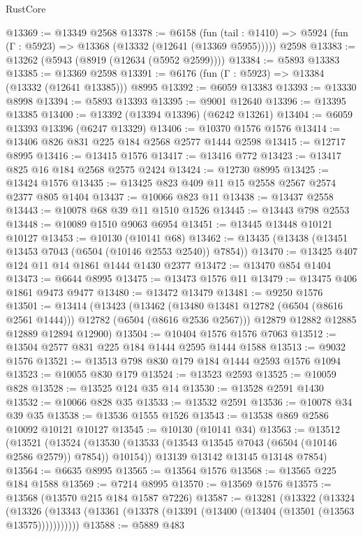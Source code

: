 \begin{lexlean}{RustCore}
\begin{coremodule}
@13369 := @13349 @2568
@13378 := @6158
    (fun (tail : @1410) => @5924 (fun (Γ : @5923) => @13368 (@13332 (@12641 (@13369 @5955)))))
    @2598
@13383 := @13262 (@5943 (@8919 (@12634 (@5952 @2599))))
@13384 := @5893 @13383
@13385 := @13369 @2598
@13391 := @6176 (fun (Γ : @5923) => @13384 (@13332 (@12641 @13385))) @8995
@13392 := @6059 @13383
@13393 := @13330 @8998
@13394 := @5893 @13393
@13395 := @9001 @12640
@13396 := @13395 @13385
@13400 := @13392 (@13394 @13396) (@6242 @13261)
@13404 := @6059 @13393 @13396 (@6247 @13329)
@13406 := @10370 @1576 @1576
@13414 := @13406 @826 @831 @225 @184 @2568 @2577 @1444 @2598
@13415 := @12717 @8995
@13416 := @13415 @1576
@13417 := @13416 @772
@13423 := @13417 @825 @16 @184 @2568 @2575 @2424
@13424 := @12730 @8995
@13425 := @13424 @1576
@13435 := @13425 @823 @409 @11 @15 @2558 @2567 @2574 @2377 @805 @1404
@13437 := @10066 @823 @11
@13438 := @13437 @2558
@13443 := @10078 @68 @39 @11 @1510 @1526
@13445 := @13443 @798 @2553
@13448 := @10089 @1510 @9063 @6954
@13451 := @13445 @13448 @10121 @10127
@13453 := @10130 (@10141 @68)
@13462 := @13435 (@13438 (@13451 @13453 @7043 (@6504 (@10146 @2553 @2540)) @7854))
@13470 := @13425 @407 @124 @11 @14 @1861 @1444 @1430 @2377
@13472 := @13470 @854 @1404
@13473 := @6644 @8995
@13475 := @13473 @1576 @11
@13479 := @13475 @406 @1861 @9473 @9477
@13480 := @13472 @13479
@13481 := @9250 @1576
@13501 := @13414
    (@13423
      (@13462 (@13480 @13481 @12782 (@6504 (@8616 @2561 @1444))) @12782 (@6504 (@8616 @2536 @2567)))
      @12879
      @12882
      @12885
      @12889
      @12894
      @12900)
@13504 := @10404 @1576 @1576 @7063
@13512 := @13504 @2577 @831 @225 @184 @1444 @2595 @1444 @1588
@13513 := @9032 @1576
@13521 := @13513 @798 @830 @179 @184 @1444 @2593 @1576 @1094
@13523 := @10055 @830 @179
@13524 := @13523 @2593
@13525 := @10059 @828
@13528 := @13525 @124 @35 @14
@13530 := @13528 @2591 @1430
@13532 := @10066 @828 @35
@13533 := @13532 @2591
@13536 := @10078 @34 @39 @35
@13538 := @13536 @1555 @1526
@13543 := @13538 @869 @2586 @10092 @10121 @10127
@13545 := @10130 (@10141 @34)
@13563 := @13512
    (@13521
      (@13524 (@13530 (@13533 (@13543 @13545 @7043 (@6504 (@10146 @2586 @2579)) @7854)) @10154))
      @13139
      @13142
      @13145
      @13148
      @7854)
@13564 := @6635 @8995
@13565 := @13564 @1576
@13568 := @13565 @225 @184 @1588
@13569 := @7214 @8995
@13570 := @13569 @1576
@13575 := @13568 (@13570 @215 @184 @1587 @7226)
@13587 := @13281
    (@13322
      (@13324
        (@13326 (@13343 (@13361 (@13378 (@13391 (@13400 (@13404 (@13501 (@13563 @13575)))))))))))
@13588 := @5889 @483

\end{coremodule}
\end{lexlean}
